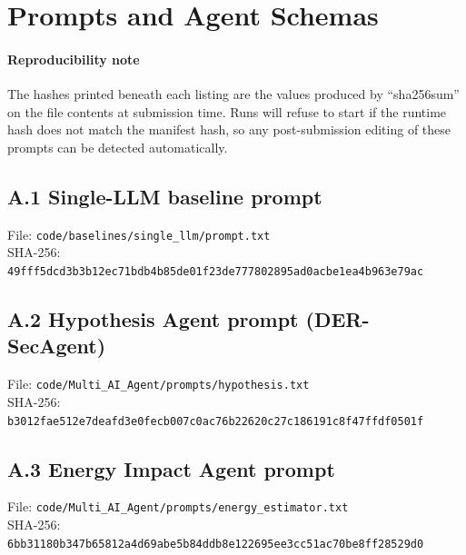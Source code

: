 \appendix
\section{Prompts and Agent Schemas}
%

\paragraph{Reproducibility note}
The hashes printed beneath each listing are the values produced by
``sha256sum'' on the file contents at submission time. Runs will refuse
to start if the runtime hash does not match the manifest hash, so any
post-submission editing of these prompts can be detected automatically.

\subsection*{A.1 Single-LLM baseline prompt}
\label{ssec:prompt-single-llm}
File: \texttt{code/baselines/single\_llm/prompt.txt} \\
SHA-256: {\small\texttt{49fff5dcd3b3b12ec71bdb4b85de01f23de777802895ad0acbe1ea4b963e79ac}}
\begin{small}

\end{small}

\subsection*{A.2 Hypothesis Agent prompt (DER-SecAgent)}
\label{ssec:prompt-hypothesis}
File: \texttt{code/Multi\_AI\_Agent/prompts/hypothesis.txt} \\
SHA-256: {\small\texttt{b3012fae512e7deafd3e0fecb007c0ac76b22620c27c186191c8f47ffdf0501f}}
\begin{small}

\end{small}

\subsection*{A.3 Energy Impact Agent prompt}
\label{ssec:prompt-energy}
File: \texttt{code/Multi\_AI\_Agent/prompts/energy\_estimator.txt} \\
SHA-256: {\small\texttt{6bb31180b347b65812a4d69abe5b84ddb8e122695ee3cc51ac70be8ff28529d0}}
\begin{small}

\end{small}

